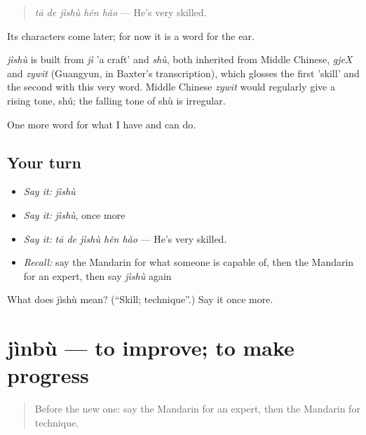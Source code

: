 \begin{quote}
\emph{tā de jìshù hěn hǎo} — He's very skilled.
\end{quote}

Its characters come later; for now it is a word for the ear.

\begin{cousinweb}
\emph{jìshù} is built from \emph{jì} 'a craft' and \emph{shù}, both inherited from Middle Chinese, \emph{gjeX} and \emph{zywit} (Guangyun, in Baxter's transcription), which glosses the first 'skill' and the second with this very word. Middle Chinese \emph{zywit} would regularly give a rising tone, shú; the falling tone of shù is irregular.
\end{cousinweb}

\begin{grammarlens}[title={What you've built}]
One more word for what I have and can do.
\end{grammarlens}

\subsection*{Your turn}
\begin{itemize}
\raggedright
  \item \emph{Say it:} \emph{jìshù}
  \item \emph{Say it:} \emph{jìshù}, once more
  \item \emph{Say it:} \emph{tā de jìshù hěn hǎo} — He's very skilled.
  \item \emph{Recall:} say the Mandarin for what someone is capable of, then the Mandarin for an expert, then say \emph{jìshù} again
\end{itemize}

\begin{tcolorbox}[breakable,colback=teal!4,colframe=teal!35!black,title={Before you move on}]
What does jìshù mean? (\textquotedblleft{}Skill; technique\textquotedblright{}.) Say it once more.
\end{tcolorbox}
\section[jìnbù]{jìnbù — to improve; to make progress}

\label{lesson:ZH-C260-jinbu}



\begin{quote}
Before the new one: say the Mandarin for an expert, then the Mandarin for technique.
\end{quote}

